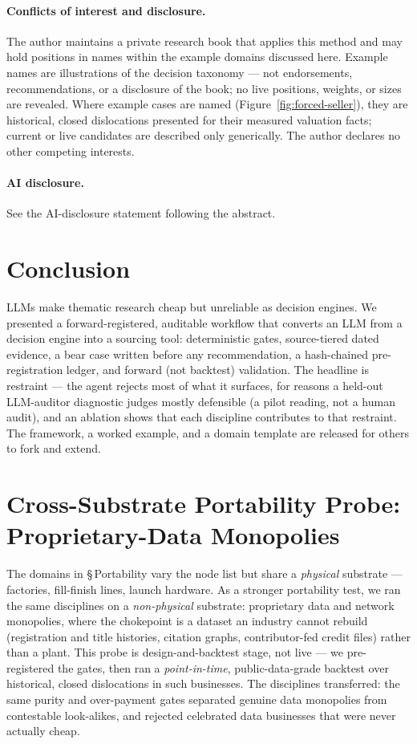 \documentclass[11pt]{article}
\begin{document}
\paragraph{Conflicts of interest and disclosure.} The author maintains a private research book that
applies this method and may hold positions in names within the example domains discussed here.
Example names are illustrations of the decision taxonomy --- not endorsements, recommendations, or a
disclosure of the book; no live positions, weights, or sizes are revealed. Where example
cases are named (Figure~\ref{fig:forced-seller}), they are historical, closed dislocations
presented for their measured valuation facts; current or live candidates are described
only generically. The author declares no other competing interests.

\paragraph{AI disclosure.} See the AI-disclosure statement following the abstract.

\section{Conclusion}
LLMs make thematic research cheap but unreliable as decision engines. We presented a
forward-registered, auditable workflow that converts an LLM from a decision engine into a sourcing
tool: deterministic gates, source-tiered dated evidence, a bear case written before any
recommendation, a hash-chained pre-registration ledger, and forward (not backtest) validation. The
headline is restraint --- the agent rejects most of what it surfaces, for reasons a held-out
LLM-auditor diagnostic judges mostly defensible (a pilot reading, not a human audit), and an ablation
shows that each discipline contributes to that restraint.
The framework, a worked example, and a domain template are released for others to fork and extend.

\appendix
\section{Cross-Substrate Portability Probe: Proprietary-Data Monopolies}
\label{app:substrate}

The domains in \S\,Portability vary the node list but share a \emph{physical} substrate ---
factories, fill-finish lines, launch hardware. As a stronger portability test, we ran the same
disciplines on a \emph{non-physical} substrate: proprietary data and network monopolies, where the
chokepoint is a dataset an industry cannot rebuild (registration and title histories, citation
graphs, contributor-fed credit files) rather than a plant. This probe is design-and-backtest stage,
not live --- we pre-registered the gates, then ran a \emph{point-in-time}, public-data-grade backtest
over historical, closed dislocations in such businesses. The disciplines transferred: the same purity
and over-payment gates separated genuine data monopolies from contestable look-alikes, and rejected
celebrated data businesses that were never actually cheap.
\end{document}
